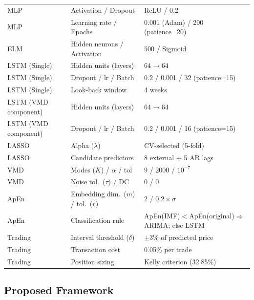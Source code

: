 \documentclass[12pt,a4paper]{article}
\begin{document}
\begin{tabular}{L{3.5cm} L{4.2cm} L{5.0cm}}
MLP                      & Activation / Dropout                 & ReLU / 0.2 \\
MLP                      & Learning rate / Epochs               & 0.001 (Adam) / 200 (patience=20) \\
ELM                      & Hidden neurons / Activation          & 500 / Sigmoid \\
LSTM (Single)            & Hidden units (layers)                & $64\to64$ \\
LSTM (Single)            & Dropout / lr / Batch                 & 0.2 / 0.001 / 32 (patience=15) \\
LSTM (Single)            & Look-back window                     & 4 weeks \\
LSTM (VMD component)     & Hidden units (layers)                & $64\to64$ \\
LSTM (VMD component)     & Dropout / lr / Batch                 & 0.2 / 0.001 / 16 (patience=15) \\
LASSO                    & Alpha ($\lambda$)                    & CV-selected (5-fold) \\
LASSO                    & Candidate predictors                 & 8 external $+$ 5 AR lags \\
VMD                      & Modes ($K$) / $\alpha$ / tol         & 9 / 2000 / $10^{-7}$ \\
VMD                      & Noise tol.\ ($\tau$) / DC            & 0 / 0 \\
ApEn                     & Embedding dim.\ ($m$) / tol.\ ($r$) & 2 / $0.2\times\sigma$ \\
ApEn                     & Classification rule                  & ApEn(IMF)$<$ApEn(original)$\Rightarrow$ARIMA; else LSTM \\
Trading                  & Interval threshold ($\delta$)        & $\pm3\%$ of predicted price \\
Trading                  & Transaction cost                     & 0.05\% per trade \\
Trading                  & Position sizing                      & Kelly criterion (32.85\%) \\
\end{tabular}
\renewcommand{\arraystretch}{1}\normalsize
\vspace{8pt}

\subsection{Proposed Framework}
\end{document}
